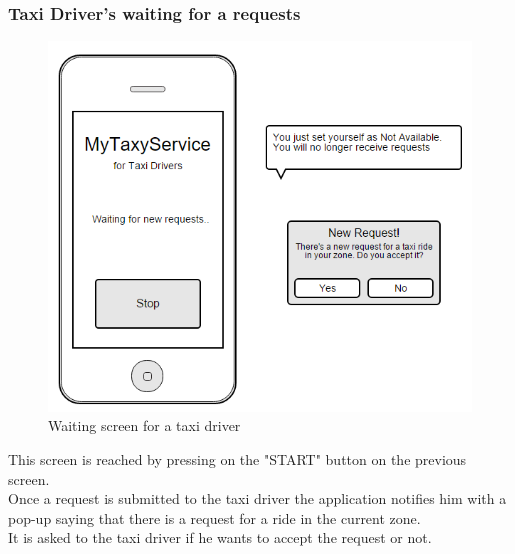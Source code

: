 \subsubsection{Taxi Driver's waiting for a requests}
\begin{figure}[H]
\centering
\includegraphics[scale=0.6]{Images/wait_taxi_driver}
\caption{Waiting screen for a taxi driver}
\end{figure}
This screen is reached by pressing on the "START" button on the previous screen.\\
Once a request is submitted to the taxi driver the application notifies him with a pop-up saying that there is a request for a ride in the current zone.\\
It is asked to the taxi driver if he wants to accept the request or not.

